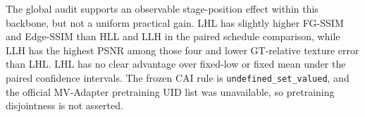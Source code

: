 \documentclass[times,twocolumn,final]{elsarticle}
\begin{document}
\begin{table}[t]
\centering
\caption{Selected within-backbone MV-Adapter means on the Exact 76-object cohort. Absolute scores are not compared with the MVPainter-style backbone.}
\label{tab:mvadapter}
\scriptsize
{}
\end{table}

The global audit supports an observable stage-position effect within this
backbone, but not a uniform practical gain. LHL has slightly higher FG-SSIM
and Edge-SSIM than HLL and LLH in the paired schedule comparison, while LLH
has the highest PSNR among those four and lower GT-relative texture error
than LHL. LHL has no clear advantage over fixed-low or fixed mean under the
paired confidence intervals. The frozen CAI rule is
\texttt{undefined\_set\_valued}, and the
official MV-Adapter pretraining UID list was unavailable, so pretraining
disjointness is not asserted.
\end{document}
